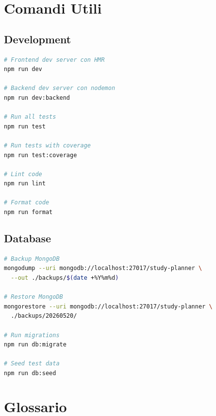 \documentclass[12pt,a4paper]{report}
\begin{document}
\chapter{Comandi Utili}

\section{Development}

\begin{lstlisting}[language=bash]
# Frontend dev server con HMR
npm run dev

# Backend dev server con nodemon
npm run dev:backend

# Run all tests
npm run test

# Run tests with coverage
npm run test:coverage

# Lint code
npm run lint

# Format code
npm run format
\end{lstlisting}

\section{Database}

\begin{lstlisting}[language=bash]
# Backup MongoDB
mongodump --uri mongodb://localhost:27017/study-planner \
  --out ./backups/$(date +%Y%m%d)

# Restore MongoDB
mongorestore --uri mongodb://localhost:27017/study-planner \
  ./backups/20260520/

# Run migrations
npm run db:migrate

# Seed test data
npm run db:seed
\end{lstlisting}

\chapter{Glossario}
\end{document}
